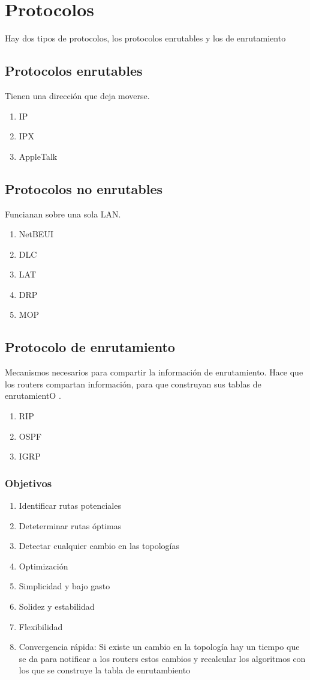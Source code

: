 \section{Protocolos}
Hay dos tipos de protocolos, los protocolos enrutables y los de enrutamiento
\subsection{Protocolos enrutables}
Tienen una dirección que deja moverse.
\begin{enumerate}
    \item IP 
    \item IPX 
    \item AppleTalk
\end{enumerate}

\subsection{Protocolos no enrutables}
Funcianan sobre una sola LAN. 
\begin{enumerate}
    \item NetBEUI 
    \item DLC 
    \item LAT 
    \item DRP 
    \item MOP
\end{enumerate}

\subsection{Protocolo de enrutamiento }
Mecanismos necesarios para compartir la información de enrutamiento. Hace que los routers compartan información, para que construyan sus tablas de enrutamientO .
\begin{enumerate}
    \item RIP 
    \item OSPF 
    \item IGRP
\end{enumerate}

\subsubsection{Objetivos}
\begin{enumerate}
    \item Identificar rutas potenciales 
    \item Deteterminar rutas óptimas 
    \item Detectar cualquier cambio en las topologías
    \item Optimización 
    \item Simplicidad y bajo gasto
    \item Solidez y estabilidad 
    \item Flexibilidad 
    \item Convergencia rápida: Si existe un cambio en la topología hay un tiempo que se da para notificar a los routers estos cambios y recalcular los algoritmos con los que se construye la tabla de enrutambiento
\end{enumerate}


